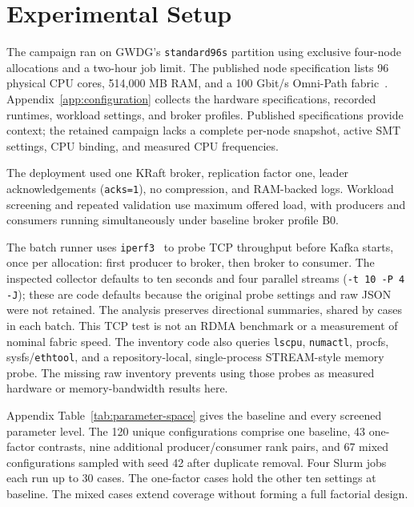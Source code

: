 \documentclass[10pt]{article}
\begin{document}
\section{Experimental Setup}
\label{sec:experimental-setup}
\label{sec:audit}

The campaign ran on GWDG's \texttt{standard96s} partition using exclusive
four-node allocations and a two-hour job limit. The published node specification
lists 96 physical CPU cores, 514,000 MB RAM, and a 100 Gbit/s Omni-Path
fabric~\cite{gwdgcpupartitions}. Appendix~\ref{app:configuration} collects the
hardware specifications, recorded runtimes, workload settings, and broker profiles.
Published specifications provide context; the retained campaign lacks a complete
per-node snapshot, active SMT settings, CPU binding, and measured CPU frequencies.


The deployment used one KRaft broker, replication factor one, leader
acknowledgements (\texttt{acks=1}), no compression, and RAM-backed logs.
Workload screening and repeated validation use maximum offered load, with
producers and consumers running simultaneously under baseline broker profile B0.

The batch runner uses \texttt{iperf3}~\cite{iperf3} to probe TCP throughput before
Kafka starts, once per allocation: first producer to broker, then broker to
consumer.  The inspected collector defaults to ten seconds and four parallel
streams (\texttt{-t 10 -P 4 -J}); these are code defaults because the original
probe settings and raw JSON were not retained.  The analysis preserves
directional summaries, shared by cases in each batch.  This TCP test is not an
RDMA benchmark or a measurement of nominal fabric speed.  The inventory code
also queries \texttt{lscpu}, \texttt{numactl}, procfs, sysfs/\texttt{ethtool}, and
a repository-local, single-process STREAM-style memory probe.  The missing raw
inventory prevents using those probes as measured hardware or memory-bandwidth
results here.

Appendix Table~\ref{tab:parameter-space} gives the baseline and every screened parameter
level.  The 120 unique configurations comprise one baseline, 43 one-factor contrasts,
nine additional producer/consumer rank pairs, and 67 mixed configurations sampled
with seed 42 after duplicate removal.  Four Slurm jobs each run up to 30 cases.
The one-factor cases hold the other ten settings at baseline.  The mixed cases
extend coverage without forming a full factorial design.
\end{document}
